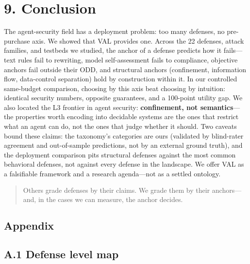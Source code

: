 \documentclass[11pt]{article}
\begin{document}
\section{9. Conclusion}\label{conclusion}

The agent-security field has a deployment problem: too many defenses, no pre-purchase axis. We showed that VAL provides one. Across the 22 defenses, attack families, and testbeds we studied, the anchor of a defense predicts how it fails---text rules fail to rewriting, model self-assessment fails to compliance, objective anchors fail outside their ODD, and structural anchors (confinement, information flow, data-control separation) hold by construction within it. In our controlled same-budget comparison, choosing by this axis beat choosing by intuition: identical security numbers, opposite guarantees, and a 100-point utility gap. We also located the L3 frontier in agent security: \textbf{confinement, not semantics}---the properties worth encoding into decidable systems are the ones that restrict what an agent can do, not the ones that judge whether it should. Two caveats bound these claims: the taxonomy's categories are ours (validated by blind-rater agreement and out-of-sample predictions, not by an external ground truth), and the deployment comparison pits structural defenses against the most common behavioral defenses, not against every defense in the landscape. We offer VAL as a falsifiable framework and a research agenda---not as a settled ontology.

\begin{quote}

Others grade defenses by their claims. We grade them by their anchors---and, in the cases we can measure, the anchor decides.

\end{quote}

\subsection{Appendix}\label{appendix}

\subsection{A.1 Defense level map}\label{a.1-defense-level-map}
\end{document}
